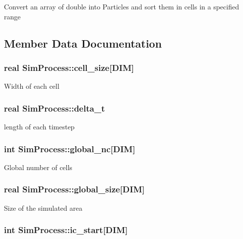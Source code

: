 Convert an array of double into Particles and sort them in cells in a specified range 

\subsection{Member Data Documentation}
\hypertarget{class_sim_process_acb71c08a7b0fc7ca809540f793421327}{
\subsubsection[{cell\-\_\-size}]{\setlength{\rightskip}{0pt plus 5cm}real Sim\-Process\-::cell\-\_\-size\mbox{[}D\-I\-M\mbox{]}}}\label{class_sim_process_acb71c08a7b0fc7ca809540f793421327}
Width of each cell \hypertarget{class_sim_process_a1862e53aaf344ae900c797d8101de8c6}{
\subsubsection[{delta\-\_\-t}]{\setlength{\rightskip}{0pt plus 5cm}real Sim\-Process\-::delta\-\_\-t}}\label{class_sim_process_a1862e53aaf344ae900c797d8101de8c6}
length of each timestep \hypertarget{class_sim_process_a43ebeee5f1b854c9ee048a72d0d0a623}{
\subsubsection[{global\-\_\-nc}]{\setlength{\rightskip}{0pt plus 5cm}int Sim\-Process\-::global\-\_\-nc\mbox{[}D\-I\-M\mbox{]}}}\label{class_sim_process_a43ebeee5f1b854c9ee048a72d0d0a623}
Global number of cells \hypertarget{class_sim_process_a3a30f5356527bf30f9cbf3f7b21f0316}{
\subsubsection[{global\-\_\-size}]{\setlength{\rightskip}{0pt plus 5cm}real Sim\-Process\-::global\-\_\-size\mbox{[}D\-I\-M\mbox{]}}}\label{class_sim_process_a3a30f5356527bf30f9cbf3f7b21f0316}
Size of the simulated area \hypertarget{class_sim_process_a629f7301a4a5fc34d75240fd53ba5266}{
\subsubsection[{ic\-\_\-start}]{\setlength{\rightskip}{0pt plus 5cm}int Sim\-Process\-::ic\-\_\-start\mbox{[}D\-I\-M\mbox{]}}}\label{class_sim_process_a629f7301a4a5fc34d75240fd53ba5266}
